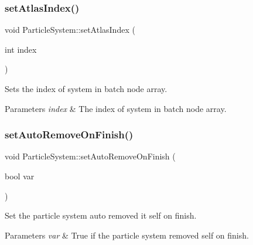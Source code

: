 \subsubsection{\texorpdfstring{set\+Atlas\+Index()}{setAtlasIndex()}\hspace{0.1cm}{\footnotesize\ttfamily [2/2]}}
{\footnotesize\ttfamily void Particle\+System\+::set\+Atlas\+Index (\begin{DoxyParamCaption}\item[{int}]{index }\end{DoxyParamCaption})\hspace{0.3cm}{\ttfamily [inline]}}

Sets the index of system in batch node array.


\begin{DoxyParams}{Parameters}
{\em index} & The index of system in batch node array. \\
\hline
\end{DoxyParams}
\mbox{\label{classParticleSystem_a08e81c9abf3433d44d1e75a4f7adae52}} 
\subsubsection{\texorpdfstring{set\+Auto\+Remove\+On\+Finish()}{setAutoRemoveOnFinish()}\hspace{0.1cm}{\footnotesize\ttfamily [1/2]}}
{\footnotesize\ttfamily void Particle\+System\+::set\+Auto\+Remove\+On\+Finish (\begin{DoxyParamCaption}\item[{bool}]{var }\end{DoxyParamCaption})\hspace{0.3cm}{\ttfamily [virtual]}}

Set the particle system auto removed it self on finish.


\begin{DoxyParams}{Parameters}
{\em var} & True if the particle system removed self on finish. \\
\hline
\end{DoxyParams}
\mbox{\label{classParticleSystem_ab4800f4aef21f54119cdf9e5a991274b}} 
